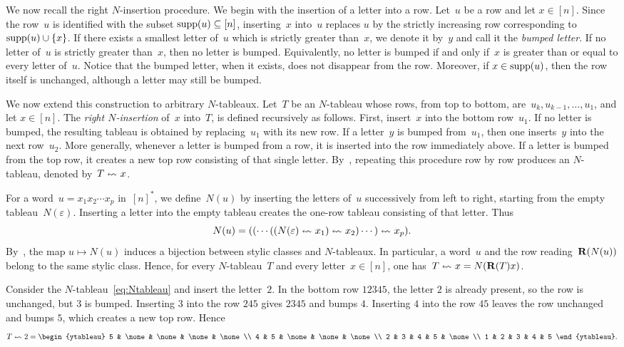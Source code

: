 \documentclass[a4paper, twoside, 11pt, english]{article}
\begin{document}
We now recall the right $N$-insertion procedure.
We begin with the insertion of a letter into a row. Let~$u$ be a row and let
$x\in[n]$. Since the row~$u$ is identified with the subset
$\operatorname{supp}(u)\subseteq[n]$, inserting~$x$ into~$u$ replaces $u$ by the strictly
increasing row corresponding to $\operatorname{supp}(u)\cup\{x\}$. If there exists a smallest
letter of~$u$ which is strictly greater than~$x$, we denote it by~$y$ and call it
the \emph{bumped letter}. If no letter of~$u$ is strictly greater than~$x$, then
no letter is bumped. Equivalently, no letter is bumped if and only if~$x$ is
greater than or equal to every letter of~$u$.
Notice that the bumped letter, when it exists, does not disappear from the row.
Moreover, if $x\in\operatorname{supp}(u)$, then the row itself is unchanged, although a letter
may still be bumped.

We now extend this construction to arbitrary $N$-tableaux. Let~$T$ be an
$N$-tableau whose rows, from top to bottom, are~$u_k,u_{k-1},\ldots,u_1$, and
let $x\in[n]$. The \emph{right $N$-insertion} of~$x$ into~$T$,  is defined recursively as follows. First, insert~$x$ into the
bottom row~$u_1$. If no letter is bumped, the resulting tableau is obtained by
replacing~$u_1$ with its new row. If a letter~$y$ is bumped from~$u_1$, then one
inserts~$y$ into the next row~$u_2$. More generally, whenever a letter is bumped
from a row, it is inserted into the row immediately above. If a letter is bumped
from the top row, it creates a new top row consisting of that single letter.
By~\cite[Proposition~6.1]{AbramReutenauerStylic}, repeating this procedure
row by row produces an $N$-tableau, denoted by~$T\insr{}x$.


For a word~$u=x_1x_2\cdots x_p$ in~$[n]^\ast$, we define~$N(u)$ by inserting
the letters of~$u$ successively from left to right, starting from the empty
tableau~$N(\varepsilon)$. Inserting a letter into the empty tableau creates the
one-row tableau consisting of that letter. Thus
\[
N(u)
=
((\cdots((N(\varepsilon)\insr{}x_1)\insr{}x_2)\cdots)\insr{}x_p).
\]
By~\cite[Theorem~7.1]{AbramReutenauerStylic}, the map
$u\longmapsto N(u)$ induces a bijection between stylic classes and
$N$-tableaux. In particular, a word~$u$ and the row reading~$\mathbf{R}(N(u))$
belong to the same stylic class. Hence, for every $N$-tableau~$T$ and every
letter~$x\in[n]$, one has~$T\insr{}x=N(\R(T)x)$.


\begin{example}
Consider the $N$-tableau~\eqref{eq:Ntableau} and insert the letter~$2$.
In the bottom row $12345$, the letter $2$ is already present, so the row is
unchanged, but $3$ is bumped. Inserting $3$ into the row $245$ gives $2345$ and
bumps $4$. Inserting $4$ into the row $45$ leaves the row unchanged and bumps
$5$, which creates a new top row. Hence
\[
T\insr{}2=
\begin{ytableau}
5 & \none & \none & \none & \none \\
4 & 5 & \none & \none & \none \\
2 & 3 & 4 & 5 & \none \\
1 & 2 & 3 & 4 & 5
\end{ytableau}.
\]
\end{example}
\end{document}
